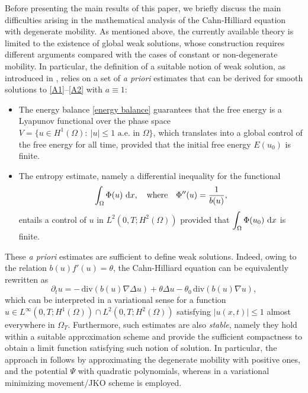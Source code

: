 \documentclass[11pt,  reqno]{amsart}%
\theoremstyle{plain}
\theoremstyle{definition}
\theoremstyle{remark}
\numberwithin{equation}{section}
\def\div{\,\mathrm{div}}
\newcommand{\dx}{\textup{d}x}
\begin{document}
Before presenting the main results of this paper, we briefly discuss the main difficulties arising in the mathematical analysis of the Cahn-Hilliard equation with degenerate mobility. As mentioned above, the currently available theory is limited to the existence of global weak solutions, whose construction requires different arguments compared with the cases of constant or non-degenerate mobility. In particular, the definition of a suitable notion of weak solution, as introduced in \cite{EG1996}, relies on a set of {\it a priori} estimates that can be derived for smooth solutions to \eqref{A1}--\eqref{A2} with $a \equiv 1$:
\begin{itemize}
\item The energy balance \eqref{energy balance} guarantees that the free energy is a Lyapunov functional over the phase space $V=\lbrace u \in H^1(\Omega): \ | u| \leq 1 \text{ a.e. in } \Omega \rbrace$, which translates into a global control of the free energy for all time, provided that the initial free energy $E(u_0)$ is finite.

\item The entropy estimate, namely a differential inequality for the functional
$$
\int_\Omega \Phi(u) \ \dx, \quad \text{where} \quad \Phi^{\prime \prime}(u)= \dfrac{1}{b(u)},
$$
 entails a control of $u$ in $L^2(0,T; H^2(\Omega))$ provided that $\displaystyle \int_\Omega \Phi(u_0) \ \dx $ is finite.
\end{itemize}
These {\it a priori} estimates are sufficient to define weak solutions. Indeed, owing to the relation $b(u) f'(u)= \theta$, the Cahn-Hilliard equation can be equivalently rewritten as 
\begin{equation}
\label{weak-CH}
\partial_t u= - \div \left( b(u) \nabla \Delta u \right) + \theta \Delta u - \theta_0 \div \left( b(u) \nabla u \right)\!,
\end{equation}
which can be interpreted in a variational sense for a function $u\in L^\infty(0,T; H^1(\Omega)) \cap L^2(0,T;H^2(\Omega))$ satisfying $|u(x,t)|\leq 1$ almost everywhere in $\Omega_T$. Furthermore, such estimates are also {\it stable}, namely they hold within a suitable approximation scheme and provide the sufficient compactness to obtain a limit function satisfying such notion of solution. In particular, the approach in \cite{EG1996} follows by approximating the degenerate mobility with positive ones, and the potential $\Psi$ with quadratic polynomials, whereas in \cite{LMS2012} a variational minimizing movement/JKO scheme is employed. 
\end{document}
